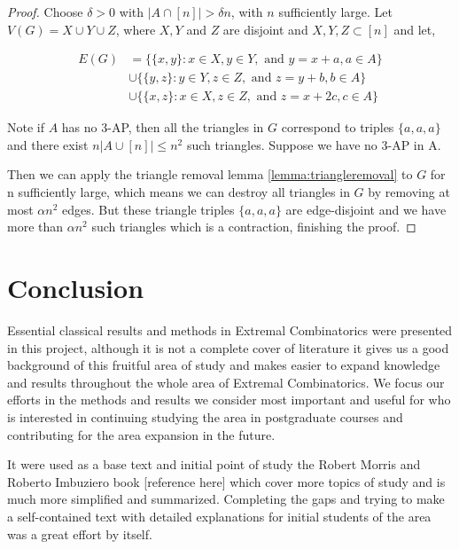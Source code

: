 \documentclass[12pt,twoside,a4paper]{book}
\numberwithin{equation}{section}
\theoremstyle{remark}
\begin{document}
\begin{proof}
Choose $\delta > 0$ with $|A \cap [n]| > \delta n$, with $n$ sufficiently large. Let $V(G) = X\cup Y \cup Z$, where $X, Y$ and $Z$ are disjoint and $X,Y,Z \subset [n]$ and let,

\begin{align*}
E(G) &= \{\{x,y\}\colon x \in X, y \in Y,\text{ and } y = x + a, a \in A\} \\
& \cup \{\{y,z\} \colon y \in Y, z \in Z, \text{ and } z = y + b, b \in A\}\\
& \cup \{\{x,z\} \colon x \in X, z \in Z, \text{ and } z = x +2c, c\in A\}
\end{align*}

Note if $A$ has no $3$-AP, then all the triangles in $G$ correspond to triples $\{a,a,a\}$ and there exist $n|A\cup [n]| \leq n^2$ such triangles. Suppose we have no $3$-AP in A.
 
 Then we can apply the triangle removal lemma \ref{lemma:triangleremoval} to $G$ for n sufficiently large, which means we can destroy all triangles in $G$ by removing at most $\alpha n^2$ edges. But these triangle triples $\{a,a,a\}$ are edge-disjoint and we have more than $\alpha n^2 $ such triangles which is a contraction, finishing the proof.
 
\end{proof}


\chapter{Conclusion}
Essential classical results and methods in Extremal Combinatorics were presented in this project, although it is not a complete cover of literature it gives us a good background of this fruitful area of study and makes easier to expand knowledge and results throughout the whole area of Extremal Combinatorics. We focus our efforts in the methods and results we consider most important and useful for who is interested in continuing studying the area in postgraduate courses and contributing for the area expansion in the future.

It were used as a base text and initial point of study the Robert Morris and Roberto Imbuziero book [reference here] which cover more topics of study and is much more simplified and summarized. Completing the gaps and trying to make a self-contained text with detailed explanations for initial students of the area was a great effort by itself.
\end{document}
